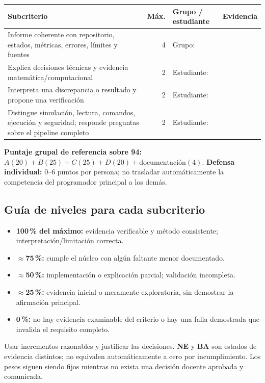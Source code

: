 \documentclass[10pt, a4paper]{article}
\begin{document}
\begingroup
\scriptsize
\setlength{\tabcolsep}{3.5pt}
\renewcommand{\arraystretch}{1.40}
\noindent\begin{tabularx}{\textwidth}{|>{\hsize=1.50\hsize\raggedright\arraybackslash}X|r|>{\hsize=0.60\hsize\raggedright\arraybackslash}X|>{\hsize=0.90\hsize\raggedright\arraybackslash}X|}
\hline
\rowcolor{ucbblue!15}
\textbf{Subcriterio} & \textbf{Máx.} & \textbf{Grupo / estudiante} & \textbf{Evidencia} \\ \hline
Informe coherente con repositorio, estados, métricas, errores, límites y fuentes & 4 & Grupo: & \\ \hline
Explica decisiones técnicas y evidencia matemática/computacional & 2 & Estudiante: & \\ \hline
Interpreta una discrepancia o resultado y propone una verificación & 2 & Estudiante: & \\ \hline
Distingue simulación, lectura, comandos, ejecución y seguridad; responde preguntas sobre el pipeline completo & 2 & Estudiante: & \\ \hline
\end{tabularx}
\endgroup

{\footnotesize\textbf{Puntaje grupal de referencia sobre 94:} $A(20) + B(25) + C(25) + D(20) + \text{documentación}(4)$. \quad \textbf{Defensa individual:} $0\text{--}6$ puntos por persona; no trasladar automáticamente la competencia del programador principal a los demás.}

\subsection*{Guía de niveles para cada subcriterio}
\begin{itemize}
    \setlength{\itemsep}{2pt}\setlength{\parskip}{0pt}
    \footnotesize
    \item \textbf{100\,\% del máximo:} evidencia verificable y método consistente; interpretación/limitación correcta.
    \item \textbf{$\approx$75\,\%:} cumple el núcleo con algún faltante menor documentado.
    \item \textbf{$\approx$50\,\%:} implementación o explicación parcial; validación incompleta.
    \item \textbf{$\approx$25\,\%:} evidencia inicial o meramente exploratoria, sin demostrar la afirmación principal.
    \item \textbf{0\,\%:} no hay evidencia examinable del criterio o hay una falla demostrada que invalida el requisito completo.
\end{itemize}
{\footnotesize Usar incrementos razonables y justificar las decisiones. \textbf{NE} y \textbf{BA} son estados de evidencia distintos; no equivalen automáticamente a cero por incumplimiento. Los pesos siguen siendo fijos mientras no exista una decisión docente aprobada y comunicada.}
\end{document}
